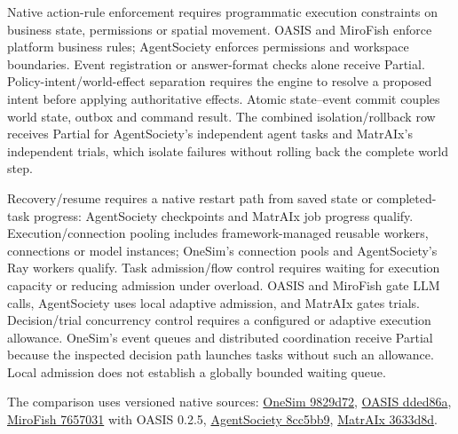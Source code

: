 \documentclass[10pt]{article}
\begin{document}
Native action-rule enforcement requires programmatic execution constraints on business state, permissions or spatial movement. OASIS and MiroFish enforce platform business rules; AgentSociety enforces permissions and workspace boundaries. Event registration or answer-format checks alone receive Partial. Policy-intent/world-effect separation requires the engine to resolve a proposed intent before applying authoritative effects. Atomic state–event commit couples world state, outbox and command result. The combined isolation/rollback row receives Partial for AgentSociety's independent agent tasks and MatrAIx's independent trials, which isolate failures without rolling back the complete world step.

Recovery/resume requires a native restart path from saved state or completed-task progress: AgentSociety checkpoints and MatrAIx job progress qualify. Execution/connection pooling includes framework-managed reusable workers, connections or model instances; OneSim's connection pools and AgentSociety's Ray workers qualify. Task admission/flow control requires waiting for execution capacity or reducing admission under overload. OASIS and MiroFish gate LLM calls, AgentSociety uses local adaptive admission, and MatrAIx gates trials. Decision/trial concurrency control requires a configured or adaptive execution allowance. OneSim's event queues and distributed coordination receive Partial because the inspected decision path launches tasks without such an allowance. Local admission does not establish a globally bounded waiting queue.

The comparison uses versioned native sources: \href{https://github.com/RUC-GSAI/YuLan-OneSim/tree/9829d72}{OneSim 9829d72}, \href{https://github.com/camel-ai/oasis/tree/dded86a}{OASIS dded86a}, \href{https://github.com/666ghj/MiroFish/tree/7657031}{MiroFish 7657031} with OASIS 0.2.5, \href{https://github.com/tsinghua-fib-lab/agentsociety/tree/8cc5bb9}{AgentSociety 8cc5bb9}, \href{https://github.com/MatrAIx-ai/MatrAIx-Persona-8B/tree/3633d8d}{MatrAIx 3633d8d}.
\end{document}
